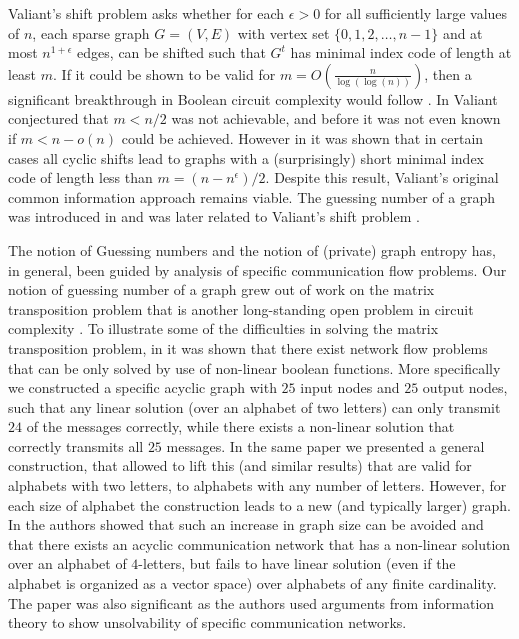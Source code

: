 \documentclass[12pt]{article}
\begin{document}
Valiant's shift problem asks whether for each $\epsilon >0$ for all sufficiently large values of $n$,
each sparse graph $G=(V,E)$ with vertex set $\{0,1,2,\ldots,n-1\}$ and at most 
$n^{1+\epsilon}$ edges, can be shifted such that $G^t$ has minimal index code of length at least $m$.
If it could be shown to be valid for $m=O(\frac{n}{\log(\log(n))})$, then a significant breakthrough in Boolean circuit complexity would follow \cite{Pudlak97} \cite{Riis07}.  In \cite{Valorg} Valiant conjectured that $m <n/2$ was not achievable, and before \cite{Riis07} it was not even known if $m < n -o(n)$ could be achieved. However in \cite{Riis07} it was shown that in certain cases all cyclic shifts lead to graphs with a (surprisingly) short minimal index code of length less than $m=(n-n^\epsilon)/2$. Despite this result, Valiant's original common information approach remains viable.  The guessing number of a graph was introduced in \cite{Riis05} and  was later related to Valiant's shift problem \cite{Riis07}.

The notion of Guessing numbers \cite{Riis05} and the notion of (private) graph entropy has, in general, been guided by analysis of specific communication flow problems. Our notion of guessing number of a graph 
grew out of work on the matrix transposition problem that is another long-standing open problem in circuit complexity \cite{Vitnew}.  To illustrate some of the difficulties in solving the matrix transposition problem, in \cite{Riis04} it was shown that there exist network flow problems that can be only solved by use of non-linear boolean functions. More specifically
we constructed  a specific acyclic graph with $25$ input nodes and $25$ output nodes, such that any linear solution (over an alphabet of two letters) can only transmit $24$ of the messages correctly, while there exists a non-linear solution that correctly transmits all $25$ messages. In the same paper 
\cite{Riis04} we presented a general construction, that allowed to lift this (and similar results) that are valid for alphabets with two letters, to alphabets with any number of letters. However, for each size of alphabet the construction leads to a new (and typically larger) graph. In \cite{DFZ05} the authors showed that such an increase in graph size can be avoided and that there exists an  acyclic communication network that has a non-linear solution  over an alphabet of $4$-letters, but fails to have linear solution (even if the alphabet is organized as a vector space) over alphabets of any finite cardinality. The paper \cite{DFZ06} was also significant as the authors used arguments from information theory to show unsolvability of specific communication networks. 
\end{document}
